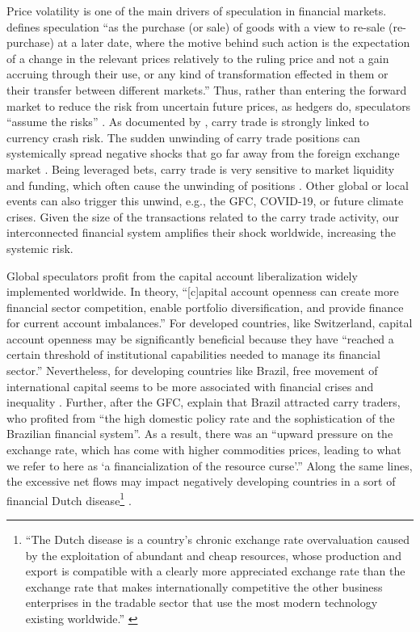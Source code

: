 \documentclass[a4paper, twoside]{templates/ociamthesis}
\begin{document}
Price volatility is one of the main drivers of speculation in financial markets. \textcite[ 111]{kaldor1976} defines speculation ``as the purchase (or sale) of goods with a view to re-sale (re-purchase) at a later date, where the motive behind such action is the expectation of a change in the relevant prices relatively to the ruling price and not a gain accruing through their use, or any kind of transformation effected in them or their transfer between different markets.'' Thus, rather than entering the forward market to reduce the risk from uncertain future prices, as hedgers do, speculators ``assume the risks'' \autocite[ 116]{kaldor1976}. As documented by \textcite{brunnermeier2008}, carry trade is strongly linked to currency crash risk. The sudden unwinding of carry trade positions can systemically spread negative shocks that go far away from the foreign exchange market \autocite{hattori2009}. Being leveraged bets, carry trade is very sensitive to market liquidity and funding, which often cause the unwinding of positions \autocite{brunnermeier2008}. Other global or local events can also trigger this unwind, e.g., the GFC, COVID-19, or future climate crises. Given the size of the transactions related to the carry trade activity, our interconnected financial system amplifies their shock worldwide, increasing the systemic risk.

Global speculators profit from the capital account liberalization widely implemented worldwide. In theory, ``{[}c{]}apital account openness can create more financial sector competition, enable portfolio diversification, and provide finance for current account imbalances.'' \autocite[ 3]{gallagher2014} For developed countries, like Switzerland, capital account openness may be significantly beneficial because they have ``reached a certain threshold of institutional capabilities needed to manage its financial sector.'' \autocite[ 3]{gallagher2014} Nevertheless, for developing countries like Brazil, free movement of international capital seems to be more associated with financial crises and inequality \autocite{gallagher2014}. Further, after the GFC, \textcite[ 2]{gallagher2014a} explain that Brazil attracted carry traders, who profited from ``the high domestic policy rate and the sophistication of the Brazilian financial system''. As a result, there was an ``upward pressure on the exchange rate, which has come with higher commodities prices, leading to what we refer to here as `a financialization of the resource curse'.'' \autocite[ 2]{gallagher2014a} Along the same lines, the excessive net flows may impact negatively developing countries in a sort of financial Dutch disease\footnote{``The Dutch disease is a country's chronic exchange rate overvaluation caused by the exploitation of abundant and cheap resources, whose production and export is compatible with a clearly more appreciated exchange rate than the exchange rate that makes internationally competitive the other business enterprises in the tradable sector that use the most modern technology existing worldwide.'' \autocite[ 372]{bresser-pereira2013}} \autocite{botta2021}.
\end{document}
